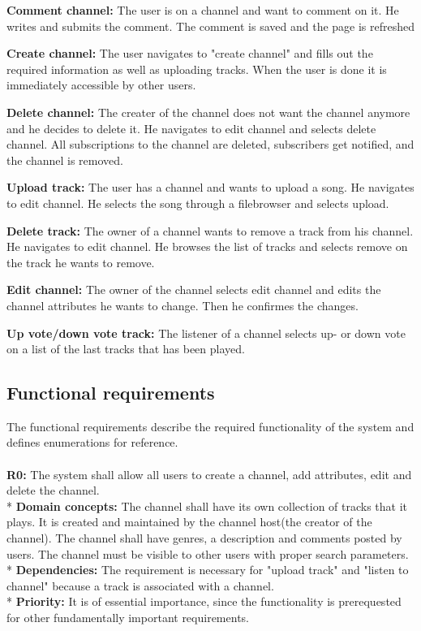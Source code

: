 \documentclass[a4paper,11pt,report]{article}
\begin{document}
{\textbf{Comment channel:}
The user is on a channel and want to comment on it. He writes and submits the comment. The comment is saved and the page is refreshed

\textbf{Create channel:}
The user navigates to "create channel" and fills out the required information as well as uploading tracks. When the user is done it is immediately accessible by other users.

\textbf{Delete channel:}
The creater of the channel does not want the channel anymore and he decides to delete it. He navigates to edit channel and selects delete channel. All subscriptions to the channel are deleted, subscribers get notified, and the channel is removed.

\textbf{Upload track:}
The user has a channel and wants to upload a song. He navigates to edit channel. He selects the song through a filebrowser and selects upload.

\textbf{Delete track:}
The owner of a channel wants to remove a track from his channel. He navigates to edit channel. He browses the list of tracks and selects remove on the track he wants to remove.

\textbf{Edit channel:}
The owner of the channel selects edit channel and edits the channel attributes he wants to change. Then he confirmes the changes.

\textbf{Up vote/down vote track:}
The listener of a channel selects up- or down vote on a list of the last tracks that has been played.

\subsection{Functional requirements}
The functional requirements describe the required functionality of the system and defines enumerations for reference.
\\ \\
\textbf{R0:}
The system shall allow all users to create a channel, add attributes, edit and delete the channel. \\*
\textbf{Domain concepts:}
The channel shall have its own collection of tracks that it plays. It is created and maintained by the channel host(the creator of the channel).
The channel shall have genres, a description and comments posted by users.
The channel must be visible to other users with proper search parameters. \\*
\textbf{Dependencies:} 
The requirement is necessary for "upload track" and "listen to channel" because a track is associated with a channel. \\*
\textbf{Priority:} 
It is of essential importance, since the functionality is prerequested for other fundamentally important requirements.
\\ \\

}
\end{document}
